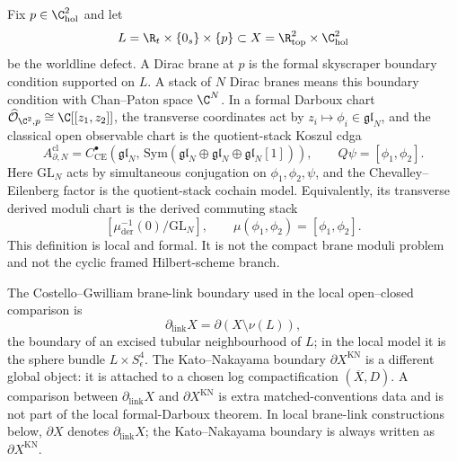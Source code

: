 \begin{defn}\label{defn:dirac-brane-stack-boundaries}
  Fix \(p\in\C^2_{\mathrm{hol}}\) and let
  \[
    L=\R_t\times\{0_s\}\times\{p\}\subset
    X=\R^2_{\mathrm{top}}\times\C^2_{\mathrm{hol}}
  \]
  be the worldline defect.  A Dirac brane at \(p\) is the formal
  skyscraper boundary condition supported on \(L\).  A stack of \(N\)
  Dirac branes means this boundary condition with Chan--Paton space
  \(\C^N\).  In a formal Darboux chart
  \(\widehat{\mathcal O}_{\C^2,p}\cong\C[[z_1,z_2]]\), the transverse
  coordinates act by
  \(z_i\mapsto\phi_i\in\mathfrak{gl}_N\), and the classical open
  observable chart is the quotient-stack Koszul cdga
  \[
    A^{\mathrm{cl}}_{\partial,N}
    =
    C^\bullet_{\mathrm{CE}}\!\left(\mathfrak{gl}_N,\,
      \mathrm{Sym}(\mathfrak{gl}_N\oplus\mathfrak{gl}_N
      \oplus\mathfrak{gl}_N[1])\right),
    \qquad
    Q\psi=[\phi_1,\phi_2].
	  \]
	  Here \(\mathrm{GL}_N\) acts by simultaneous conjugation on
	  \(\phi_1,\phi_2,\psi\), and the Chevalley--Eilenberg factor is the
	  quotient-stack cochain model.
	  Equivalently, its transverse derived moduli chart is the derived
	  commuting stack
  \[
    [\mu^{-1}_{\mathrm{der}}(0)/\mathrm{GL}_N],
    \qquad
    \mu(\phi_1,\phi_2)=[\phi_1,\phi_2].
  \]
  This definition is local and formal.  It is not the compact brane
  moduli problem and not the cyclic framed Hilbert-scheme branch.

  The Costello--Gwilliam brane-link boundary used in the local
  open--closed comparison is
  \[
    \partial_{\mathrm{link}}X
    =
    \partial(X\setminus\nu(L)),
  \]
  the boundary of an excised tubular neighbourhood of \(L\); in the
  local model it is the sphere bundle \(L\times S^4_\epsilon\).  The
  Kato--Nakayama boundary \(\partial X^{\mathrm{KN}}\) is a different
  global object: it is attached to a chosen log compactification
  \((\overline X,D)\).  A comparison between
  \(\partial_{\mathrm{link}}X\) and \(\partial X^{\mathrm{KN}}\) is
  extra matched-conventions data and is not part of the local
  formal-Darboux theorem.  In local brane-link constructions below,
  \(\partial X\) denotes \(\partial_{\mathrm{link}}X\); the
  Kato--Nakayama boundary is always written as \(\partial
  X^{\mathrm{KN}}\).
\end{defn}

